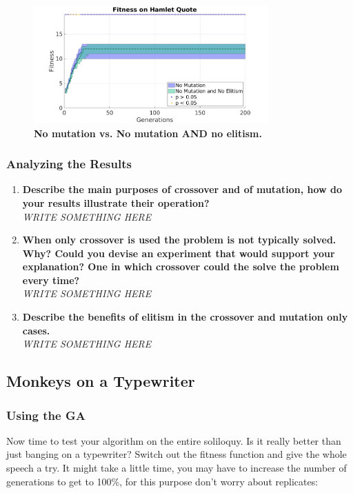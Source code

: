 \documentclass{article}
\begin{document}
		\hspace{-5mm}
\begin{figure}[h!]

		\includegraphics[width=0.8\textwidth]{img/5_vsNoMutNoElite.png}
	\caption
	{		\textbf{No mutation vs. No mutation AND no elitism.}}
\end{figure}
\newpage
\subsubsection{Analyzing the Results}
\begin{enumerate}
	\item \textbf{Describe the main purposes of crossover and of mutation, how do your results illustrate their operation?} \\
\textit{
 \color{red}WRITE SOMETHING HERE
 }

	\item \textbf{When only crossover is used the problem is not typically solved. Why? Could you devise an experiment that would support your explanation? One in which crossover could the solve the problem every time?}\\
\textit{
\color{red}WRITE SOMETHING HERE
 }
	
	\item \textbf{Describe the benefits of elitism in the crossover and mutation only cases.}\\
\textit{
\color{red}WRITE SOMETHING HERE
}

\end{enumerate}

\newpage
\subsection{Monkeys on a Typewriter}
\subsubsection{Using the GA}
Now time to test your algorithm on the entire soliloquy. Is it really better than just banging on a typewriter? Switch out the fitness function and give the whole speech a try. It might take a little time, you may have to increase the number of generations to get to 100\%, for this purpose don't worry about replicates:
\end{document}
